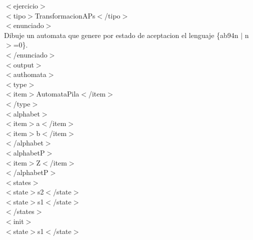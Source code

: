 \documentclass[12pt,a4paper,spanish]{book}
\begin{document}
{\ttfamily

\noindent$<$ejercicio$>$\\

$<$tipo$>$TransformacionAPs$<$/tipo$>$\\

$<$enunciado$>$\\

Dibuje un automata que genere por estado de aceptacion el lenguaje \{ab\char94n $|$ n$>$=0\}.\\

$<$/enunciado$>$\\

$<$output$>$\\

$<$authomata$>$\\

\indent $<$type$>$\\

\indent \indent $<$item$>$AutomataPila$<$/item$>$\\

\indent $<$/type$>$\\

\indent $<$alphabet$>$\\

\indent \indent $<$item$>$a$<$/item$>$\\

\indent \indent $<$item$>$b$<$/item$>$\\

\indent $<$/alphabet$>$\\

\indent \indent $<$alphabetP$>$\\

\indent \indent \indent $<$item$>$Z$<$/item$>$\\

\indent \indent $<$/alphabetP$>$\\

\indent $<$states$>$\\

\indent \indent $<$state$>$s2$<$/state$>$\\

\indent \indent $<$state$>$s1$<$/state$>$\\

\indent $<$/states$>$\\

\indent $<$init$>$\\

\indent \indent $<$state$>$s1$<$/state$>$\\

}
\end{document}
